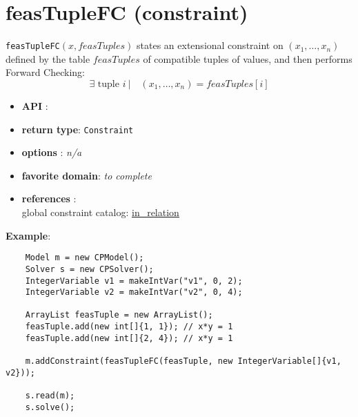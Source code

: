 \label{feastuplefc}
\hypertarget{feastuplefc}{}

\section{feasTupleFC (constraint)}\label{feastuplefc:feastuplefcconstraint}\hypertarget{feastuplefc:feastuplefcconstraint}{}
\begin{notedef}
  \texttt{feasTupleFC}$(x,feasTuples)$ states an extensional constraint on $(x_1,\ldots,x_n)$ defined by the table $feasTuples$ of compatible tuples of values, and then performs Forward Checking:
      $$\exists \text{ tuple } i\ |\quad (x_1,\ldots,x_n)=feasTuples[i]$$
\end{notedef}


\begin{itemize}
	\item \textbf{API} : 
	\item \textbf{return type}: \texttt{Constraint}
	\item \textbf{options} : \emph{n/a}
	\item \textbf{favorite domain}: \emph{to complete}
	\item \textbf{references} :\\
      global constraint catalog: \href{http://www.emn.fr/x-info/sdemasse/gccat/Cin_relation.html}{in\_relation}
\end{itemize}

\textbf{Example}:
\begin{lstlisting}
	Model m = new CPModel();
	Solver s = new CPSolver();
	IntegerVariable v1 = makeIntVar("v1", 0, 2);
	IntegerVariable v2 = makeIntVar("v2", 0, 4);
	
	ArrayList feasTuple = new ArrayList();
	feasTuple.add(new int[]{1, 1}); // x*y = 1
	feasTuple.add(new int[]{2, 4}); // x*y = 1
	
	m.addConstraint(feasTupleFC(feasTuple, new IntegerVariable[]{v1, v2}));
	
	s.read(m);
	s.solve();
\end{lstlisting}
